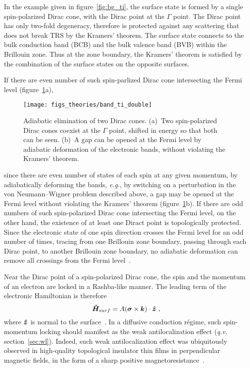 In the example given in figure~\ref{fig:bg_ti}, the surface state is formed by a single spin-polarized Dirac cone, with the Dirac point at the $\Gamma$ point. The Dirac point has only two-fold degeneracy, therefore is protected against any scattering that does not break TRS by the Kramers' theorem. The surface state connects to the bulk conduction band (BCB) and the bulk valence band (BVB) within the Brillouin zone. Thus at the zone boundary, the Kramers' theorem is satisfied by the combination of the surface states on the opposite surfaces.

If there are even number of such spin-parlized Dirac cone intersecting the Fermi level (figure~\ref{fig:bg_ti_double}a), %
\begin{figure}[ht]%
    \centering%
    \texttt{[image: figs\_theories/band\_ti\_double]}%
    \caption[Adiabatic elimination of two Dirac cones]{\label{fig:bg_ti_double}Adiabatic elimination of two Dirac cones. (a)~Two spin-polarized Dirac cones coexist at the $\Gamma$ point, shifted in energy so that both can be seen. (b)~A gap can be opened at the Fermi level by adiabatic deformation of the electronic bands, without violating the Kramers' theorem.}%
\end{figure}%
%
since there are even number of states of each spin at any given momentum, by adiabatically deforming the bands, \textit{e.g.}, by switching on a perturbation in the von Neumann--Wigner problem described above, a gap may be opened at the Fermi level without violating the Kramers' theorem (figure~\ref{fig:bg_ti_double}b). If there are odd numbers of such spin-polarized Dirac cone intersecting the Fermi level, on the other hand, the existence of at least one Diract point is topologically protected. Since the electronic state of one spin direction crosses the Fermi level for an odd number of times, tracing from one Brillouin zone boundary, passing through each Dirac point, to another Brillouin zone boundary, no adiabatic deformation can remove all crossings from the Fermi level~\cite{Kane2005}.

Near the Dirac point of a spin-polarized Dirac cone, the spin and the momentum of an electron are locked in a Rashba-like manner. The leading term of the electronic Hamiltonian is therefore%
\begin{equation}%
    \op{H}_{surf} = A (\vec{\sigma} \times \vec{k}) \cdot \vu*{z}~,\label{eq:surf_Rashba}%
\end{equation}%
where $\vu*{z}$ is normal to the surface~\cite{TI_Qi, TI_electronic_structure_zhang, Liu2010}. In a diffusive conduction r\'egime, such spin-momentum locking should manifest as the weak antilocalization effect (\textit{q.v.} section~\ref{sec:wl}). Indeed, such weak antilocalization effect was ubiquitously observed in high-quality topological insulator thin films in perpendicular magnetic fields, in the form of a sharp positive magnetoresistance~\cite{TI_WAL_Hongkong, TI_WAL_thickness, zhangli2012}.

